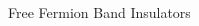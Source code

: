\begin{frame}{Free Fermion Band Insulators}
\vskip-1.5cm
\begin{columns}[T]
\begin{column}[T]{0.65\textwidth}
\end{column}
\end{columns}
\end{frame}
